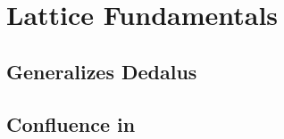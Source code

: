 \section{Lattice Fundamentals}

\subsection{\latlang Generalizes Dedalus}

\subsection{Confluence in \latlang}
